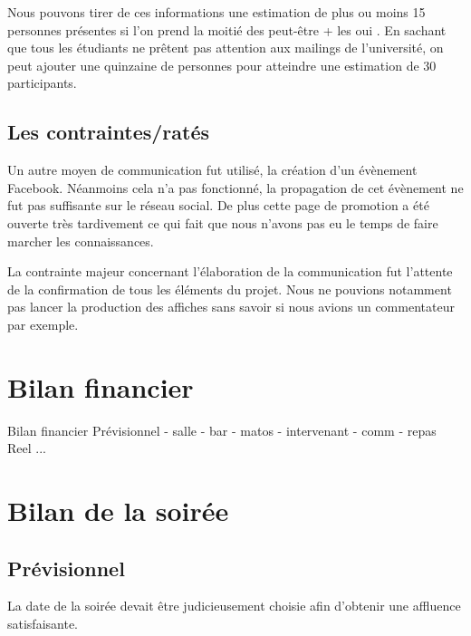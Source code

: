 Nous pouvons tirer de ces informations une estimation de plus ou moins 15 personnes présentes si l’on prend
la moitié des \og peut-être \fg{} + les \og oui \fg{}.
En sachant que tous les étudiants ne prêtent pas attention aux mailings de l’université, on peut ajouter
une quinzaine de personnes pour atteindre une estimation de 30 participants.
\subsection{Les contraintes/ratés}%
\label{sub:les_contraintes_rates}

Un autre moyen de communication fut utilisé, la création d'un évènement
Facebook. Néanmoins cela n'a pas fonctionné, la propagation de cet
évènement ne fut pas suffisante sur le réseau social. De plus cette page
de promotion a été ouverte très tardivement ce qui fait que  nous
n'avons pas eu le temps de faire marcher les connaissances.

La contrainte majeur concernant l'élaboration de la communication fut l'attente
de la confirmation de tous les éléments du projet.  Nous ne pouvions
notamment pas lancer la production des affiches sans savoir si nous
avions un commentateur par exemple.


\section{Bilan financier}%
\label{sec:bilan_financier}

Bilan financier
        Prévisionnel
            - salle
            - bar
            - matos
            - intervenant
            - comm
            - repas
        Reel
           ...

\section{Bilan de la soirée}%
\label{sec:Bilan_de_la_soiree}

\subsection{Prévisionnel}%
\label{sub:previsionnel}

La date de la soirée devait être judicieusement choisie afin d'obtenir une affluence satisfaisante.

